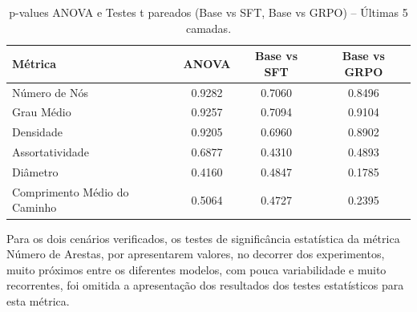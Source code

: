 \begin{table}[ht]
    \centering
    \caption{p-values ANOVA e Testes t pareados (Base vs SFT, Base vs GRPO) – Últimas 5 camadas.}
    \label{tab:anova-ttest-lastfive}
    \begin{tabular}{|l|c|c|c|}
        \hline
        Métrica & ANOVA & Base vs SFT & Base vs GRPO \\
        \hline
        Número de Nós & 0.9282 & 0.7060 & 0.8496 \\
        Grau Médio & 0.9257 & 0.7094 & 0.9104 \\
        Densidade & 0.9205 & 0.6960 & 0.8902 \\
        Assortatividade & 0.6877 & 0.4310 & 0.4893 \\
        Diâmetro & 0.4160 & 0.4847 & 0.1785 \\
        Comprimento Médio do Caminho & 0.5064 & 0.4727 & 0.2395 \\
        \hline
    \end{tabular}
    \fonte{}
\end{table}

Para os dois cenários verificados, os testes de significância estatística da métrica Número de Arestas, por apresentarem valores, no decorrer dos experimentos, muito próximos entre os diferentes modelos, com pouca variabilidade e muito recorrentes, foi omitida a apresentação dos resultados dos testes estatísticos para esta métrica.
